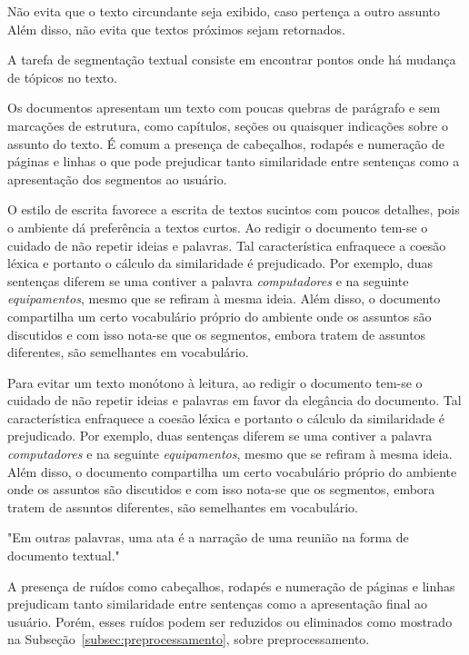 Não evita que o texto circundante seja exibido, caso pertença a outro assunto
Além disso, não evita que textos próximos sejam retornados.

A tarefa de segmentação textual consiste em encontrar pontos onde há mudança de tópicos no texto.  %



 Os documentos apresentam um texto com poucas quebras de parágrafo e sem marcações de estrutura, como capítulos, seções ou quaisquer indicações sobre o assunto do texto. É comum a presença de cabeçalhos, rodapés e numeração de páginas e linhas o que pode prejudicar tanto similaridade entre sentenças como a apresentação dos segmentos ao usuário. %



O estilo de escrita favorece a escrita de textos sucintos com poucos detalhes, pois o ambiente dá preferência a textos curtos. Ao redigir o documento tem-se o cuidado de não repetir ideias e palavras. Tal característica enfraquece a coesão léxica e portanto o cálculo da similaridade é prejudicado. Por exemplo, duas sentenças diferem se uma contiver a palavra \textit{computadores} e na seguinte \textit{equipamentos}, mesmo que se refiram à mesma ideia. Além disso, o documento compartilha um certo vocabulário próprio do ambiente onde os assuntos são discutidos e com isso nota-se que os segmentos, embora tratem de assuntos diferentes, são semelhantes em vocabulário.


Para evitar um texto monótono à leitura, ao redigir o documento tem-se o cuidado de não repetir ideias e palavras em favor da elegância do documento. Tal característica enfraquece a coesão léxica e portanto o cálculo da similaridade é prejudicado. Por exemplo, duas sentenças diferem se uma contiver a palavra \textit{computadores} e na seguinte \textit{equipamentos}, mesmo que se refiram à mesma ideia. Além disso, o documento compartilha um certo vocabulário próprio do ambiente onde os assuntos são discutidos e com isso nota-se que os segmentos, embora tratem de assuntos diferentes, são semelhantes em vocabulário.


"Em outras palavras, uma ata é a narração de uma reunião na forma de documento textual."

A presença de ruídos como cabeçalhos, rodapés e numeração de páginas e linhas prejudicam tanto similaridade entre sentenças como a apresentação final ao usuário. Porém, esses ruídos podem ser reduzidos ou eliminados como mostrado na Subseção~\ref{subsec:preprocessamento}, sobre preprocessamento.


